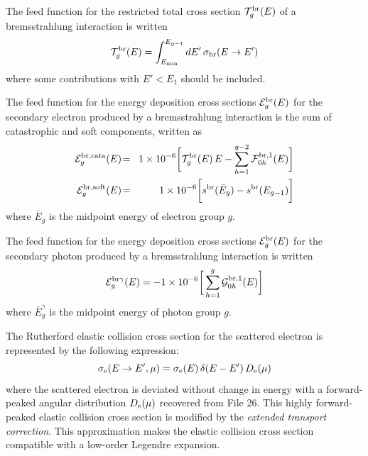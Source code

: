 The feed function for the restricted total cross section
${\cal T}^{\rm br}_g(E)$ of a bremsstrah\-lung interaction is written
  \begin{equation}
  {\cal T}^{\rm br}_g(E)=\int_{E_{\rm min}}^{E_{g-1}} dE' \,
     \sigma_{\rm br}(E\rightarrow E')
  \label{elr_eq18}
  \end{equation}
\noindent where some contributions with $E'< E_{1}$ should be included.

The feed function for the energy deposition cross sections
${\cal E}_g^{\rm br}(E)$ for the secondary electron produced by a
bremsstrahlung interaction is the sum of catastrophic and soft components,
written as
  \begin{eqnarray}
  \nonumber {\cal E}_g^{\rm br,cata}(E)\negthinspace &=&\negthinspace 1\times
  10^{-6} \bigg[{\cal T}^{\rm br}_g(E)\, E  -\sum_{h=1}^{g-2}
  {\cal F}^{{\rm br},1}_{0 h}(E)\bigg] \\
  {\cal E}_g^{\rm br,soft}(E)\negthinspace &=&\negthinspace 1\times
  10^{-6}\bigg[ s^{\rm br}(\bar E_g) - s^{\rm br}(E_{g-1})\bigg]
  \label{elr_eq19}
  \end{eqnarray}
\noindent where $\bar E_g$ is the midpoint energy of electron group $g$.

The feed function for the energy deposition cross sections
${\cal E}_g^{\rm br}(E)$ for the secondary photon produced by a
bremsstrahlung interaction is written
  \begin{equation}
  {\cal E}_g^{{\rm br}\gamma}(E)=-1\times 10^{-6}\bigg[\sum_{h=1}^g
  {\cal G}^{{\rm br},1}_{0 h}(E)\bigg]
  \label{elr_eq20}
  \end{equation}
\noindent where $\bar E_g^\gamma$ is the midpoint energy of photon group $g$.

The Rutherford elastic collision cross section 
for the scattered electron is represented by the following expression:
  \begin{equation}
    \sigma_{\rm e}(E\rightarrow E',\mu) = \sigma_{\rm e}(E) \, \delta(E-E')
    \, D_{\rm e}(\mu)
  \label{elr_eq21}
  \end{equation}
\noindent where the scattered electron is deviated without change in energy
with a forward-peaked angular distribution $D_{\rm e}(\mu)$ recovered from
File 26. This highly forward-peaked elastic collision cross section is modified
by the {\sl extended transport correction}. This approximation makes the
elastic collision cross section compatible with a low-order Legendre expansion.

